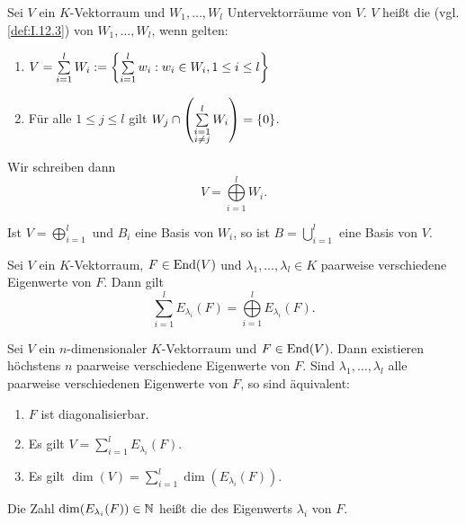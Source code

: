 \begin{definition}
	\label{def:I.16.17}
	Sei $V$ ein $K$-Vektorraum und $W_1,\dots,W_l$ Untervektorräume von $V$.
	$V$ heißt die  (vgl. \autoref{def:I.12.3}) von $W_1,\dots,W_l$, wenn gelten:
	\begin{enumerate}[(1)]
		\item $V = \sum\limits_{i=1}^{l} W_i := \left\{\sum\limits_{i=1}^{l} w_i : w_i \in W_i, 1 \leq i \leq l\right\}$
		\item Für alle $1 \leq j \leq l$ gilt $W_j \cap \left(\sum\limits_{\substack{i = 1 \\ i \neq j}}^{l} W_i\right) = \{0\}$.
	\end{enumerate}
	Wir schreiben dann
	\[
		V = \bigoplus\limits_{i=1}^l W_i.
	\]
\end{definition}

\begin{lemma}
	\label{lemma:I.16.18}
	Ist $V = \bigoplus\limits_{i=1}^{l}$ und $B_i$ eine Basis von $W_i$, so ist $B = \bigcup\limits_{i=1}^{l}$ eine Basis von $V$.
\end{lemma}

\begin{satz}
	\label{satz:I.16.19}
	Sei $V$ ein $K$-Vektorraum, $F \in \operatorname{End}(V)$ und $\lambda_1,\dots,\lambda_l \in K$ paarweise verschiedene Eigenwerte von $F$.
	Dann gilt
	\[
		\sum\limits_{i=1}^l E_{\lambda_i}(F) = \bigoplus\limits_{i=1}^{l} E_{\lambda_i}(F).
	\]
\end{satz}
\newpage
\begin{satz}
	\label{satz:I.16.20}
	Sei $V$ ein $n$-dimensionaler $K$-Vektorraum und $F \in \operatorname{End}(V)$.
	Dann existieren höchstens $n$ paarweise verschiedene Eigenwerte von $F$.
	Sind $\lambda_1,\dots,\lambda_l$ alle paarweise verschiedenen Eigenwerte von $F$, so sind äquivalent:
	\begin{enumerate}[(1)]
		\item $F$ ist diagonalisierbar.
		\item Es gilt $V = \sum\limits_{i=1}^{l} E_{\lambda_i}(F)$.
		\item Es gilt $\dim(V) = \sum\limits_{i=1}^l \dim(E_{\lambda_i}(F))$.
	\end{enumerate}
\end{satz}

\begin{definition}
	\label{def:I.16.21}
	Die Zahl $\dim(E_{\lambda_i}(F)) \in \mathbb{N}$ heißt die  des Eigenwerts $\lambda_i$ von $F$.
\end{definition}